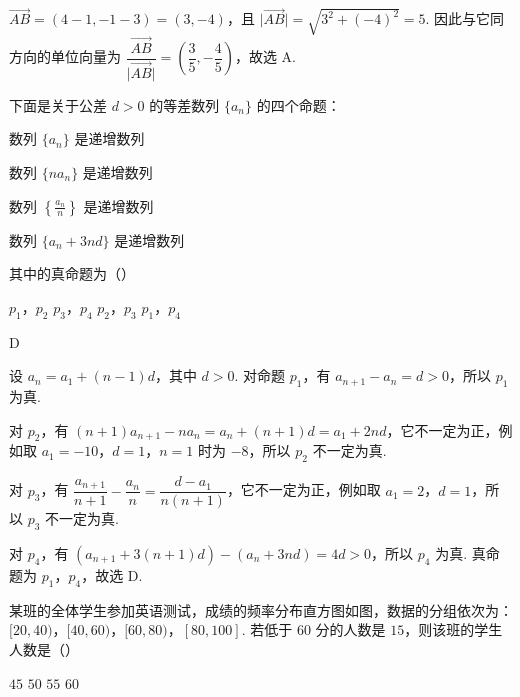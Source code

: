 \begin{solution}
\(\overrightarrow{AB}=(4-1,-1-3)=(3,-4)\)，且 \(\lvert\overrightarrow{AB}\rvert=\sqrt{3^2+(-4)^2}=5\). 因此与它同方向的单位向量为
\(\dfrac{\overrightarrow{AB}}{\lvert\overrightarrow{AB}\rvert}=\left(\dfrac35,-\dfrac45\right)\)，故选 A.
\end{solution}

\begin{problem}
下面是关于公差 \(d > 0\) 的等差数列 \(\{a_n\}\) 的四个命题：

\begin{circlelist}
\item 数列 \(\{a_n\}\) 是递增数列
\item 数列 \(\{na_n\}\) 是递增数列
\item 数列 \(\left\{\frac{a_n}{n}\right\}\) 是递增数列
\item 数列 \(\{a_n + 3nd\}\) 是递增数列
\end{circlelist}

其中的真命题为（\quad）

\choices
    {\(p_1\)，\(p_2\)}
    {\(p_3\)，\(p_4\)}
    {\(p_2\)，\(p_3\)}
    {\(p_1\)，\(p_4\)}
\end{problem}

\begin{answer}
D
\end{answer}

\begin{solution}
设 \(a_n=a_1+(n-1)d\)，其中 \(d>0\). 对命题 \(p_1\)，有 \(a_{n+1}-a_n=d>0\)，所以 \(p_1\) 为真.

对 \(p_2\)，有
\((n+1)a_{n+1}-na_n=a_n+(n+1)d=a_1+2nd\)，它不一定为正，例如取 \(a_1=-10\)，\(d=1\)，\(n=1\) 时为 \(-8\)，所以 \(p_2\) 不一定为真.

对 \(p_3\)，有
\(\dfrac{a_{n+1}}{n+1}-\dfrac{a_n}{n}=\dfrac{d-a_1}{n(n+1)}\)，它不一定为正，例如取 \(a_1=2\)，\(d=1\)，所以 \(p_3\) 不一定为真.

对 \(p_4\)，有 \((a_{n+1}+3(n+1)d)-(a_n+3nd)=4d>0\)，所以 \(p_4\) 为真. 真命题为 \(p_1\)，\(p_4\)，故选 D.
\end{solution}

\begin{problem}
某班的全体学生参加英语测试，成绩的频率分布直方图如图，数据的分组依次为：\([20,40)\)，\([40,60)\)，\([60,80)\)，\([80,100]\). 若低于 \(60\) 分的人数是 \(15\)，则该班的学生人数是（\quad）


\choices
    {\(45\)}
    {\(50\)}
    {\(55\)}
    {\(60\)}
\end{problem}

